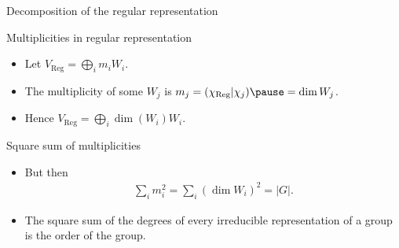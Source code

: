 \documentclass[10pt]{beamer}
\newcommand{\Reg}{\text{Reg}}
\begin{document}
	\begin{frame}{Decomposition of the regular representation}
		\begin{block}{Multiplicities in regular representation}
			\begin{itemize}
				\item Let $ V_\Reg = \bigoplus_i m_i W_i$.\pause
				
				\item The multiplicity of some $W_j$ is $m_j = (\chi_\Reg|\chi_j) \pause = \dim W_j$.\pause
				
				\item Hence $V_\Reg = \bigoplus_i \dim(W_i)W_i$.
			\end{itemize}
		\end{block}\pause
		\begin{block}{Square sum of multiplicities}\pause
						\begin{itemize}
								\item But then \begin{align*}
										\sum_i m_i^2 = \boxed{\sum_i (\dim W_i)^2 = |G|}.
									\end{align*}\pause
								\item The square sum of the degrees of every irreducible representation of a group is the order of the group.
							\end{itemize}
					\end{block}
		
	\end{frame}
	
\end{document}
